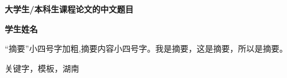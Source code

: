 \thispagestyle{empty} %
\begin{center}
    {\songti{}\textbf{大学生/本科生课程论文的中文题目} \par}
    {\songti{}\textbf{学生姓名} \par}
\end{center}

\begin{hutb_abstract}
    “摘要”小四号字加粗,摘要内容小四号字。我是摘要，这是摘要，所以是摘要。
\end{hutb_abstract}

\begin{hutb_keywords}
    关键字，模板，湖南
\end{hutb_keywords}